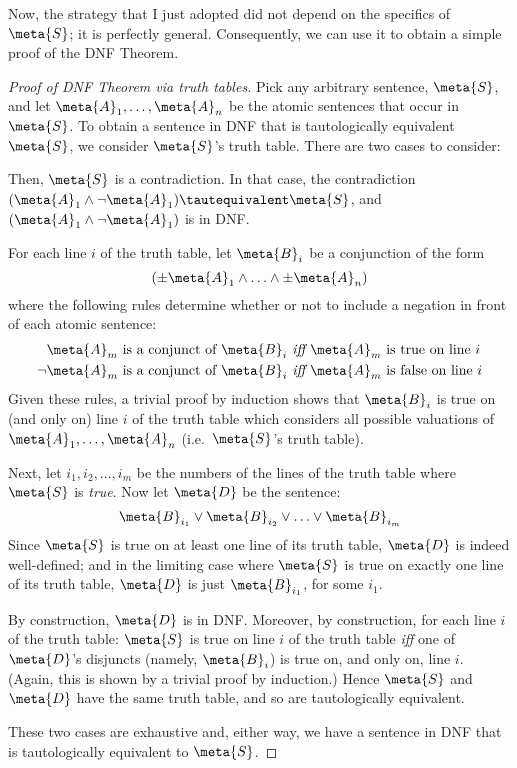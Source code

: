 Now, the strategy that I just adopted did not depend on the specifics of $\meta{S}$; it is perfectly general. Consequently, we can use it to obtain a simple proof of the DNF Theorem.

\begin{proof}[Proof of DNF Theorem via truth tables]
Pick any arbitrary sentence, $\meta{S}$, and let $\meta{A}_1, \ldots, \meta{A}_n$ be the atomic sentences that occur in $\meta{S}$. To obtain a sentence in DNF that is tautologically equivalent $\meta{S}$, we consider $\meta{S}$'s truth table. There are two cases to consider:
	\begin{ebullet}
		\item[\emph{Case 1: $\meta{S}$ is false on every line of its truth table.}] Then, $\meta{S}$ is a contradiction. In that case, the contradiction $(\meta{A}_1 \land \lnot \meta{A}_1) \tautequivalent \meta{S}$, and $(\meta{A}_1 \land \lnot \meta{A}_1)$ is in DNF. 
	
		\item[\emph{Case 2:  $\meta{S}$ is true on at least one line of its truth table.}]
		For each line $i$ of the truth table, let $\meta{B}_i$ be a conjunction of the form 
		$$(\pm\meta{A}_1 \land \ldots \land \pm\meta{A}_n)$$
		where the following rules determine whether or not to include a negation in front of each atomic sentence:
			\begin{align*}
				\meta{A}_m\text{ is a conjunct of }\meta{B}_i&\emph{ iff }\meta{A}_m\text{ is true on line }i\\
				\lnot\meta{A}_m\text{ is a conjunct of }\meta{B}_i&\emph{ iff }\meta{A}_m\text{ is false on line }i
			\end{align*}
		Given these rules, a trivial proof by induction shows that $\meta{B}_i$ is true on (and only on) line $i$ of the truth table which considers all possible valuations of $\meta{A}_1, \ldots, \meta{A}_n$ (i.e.\ $\meta{S}$'s truth table). 
		
		Next, let $i_1, i_2, \ldots, i_m$ be the numbers of the lines of the truth table where $\meta{S}$ is \emph{true}. Now let $\meta{D}$ be the sentence:
		$$\meta{B}_{i_1} \lor \meta{B}_{i_2} \lor \ldots \lor \meta{B}_{i_m}$$
		Since $\meta{S}$ is true on at least one line of its truth table, $\meta{D}$ is indeed well-defined; and in the limiting case where $\meta{S}$ is true on exactly one line of its truth table, $\meta{D}$ is just $\meta{B}_{i_1}$, for some $i_1$.
		
		By construction, $\meta{D}$ is in DNF. Moreover, by construction, for each line $i$ of the truth table: $\meta{S}$ is true on line $i$ of the truth table \emph{iff} one of $\meta{D}$'s disjuncts (namely, $\meta{B}_i$) is true on, and only on, line $i$. (Again, this is shown by a trivial proof by induction.) Hence $\meta{S}$ and $\meta{D}$ have the same truth table, and so are tautologically equivalent.
	\end{ebullet}
	These two cases are exhaustive and, either way, we have a sentence in DNF that is tautologically equivalent to $\meta{S}$.
\end{proof}\noindent
